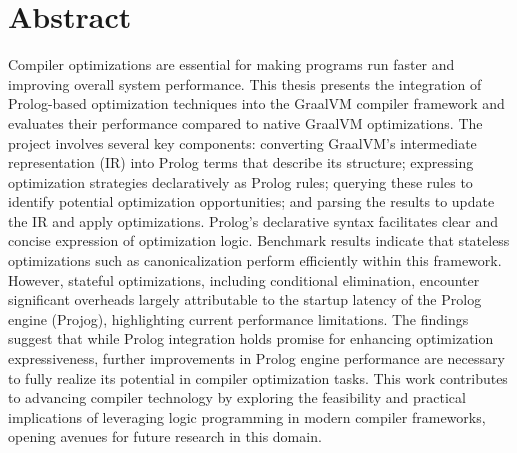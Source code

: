 \chapter[Abstract]{Abstract}

\noindent
Compiler optimizations are essential for making programs run faster and improving overall system performance. This thesis presents the integration of Prolog-based optimization techniques into the GraalVM compiler framework and evaluates their performance compared to native GraalVM optimizations. The project involves several key components: converting GraalVM’s intermediate representation (IR) into Prolog terms that describe its structure; expressing optimization strategies declaratively as Prolog rules; querying these rules to identify potential optimization opportunities; and parsing the results to update the IR and apply optimizations.
Prolog’s declarative syntax facilitates clear and concise expression of optimization logic. Benchmark results indicate that stateless optimizations such as canonicalization perform efficiently within this framework. However, stateful optimizations, including conditional elimination, encounter significant overheads largely attributable to the startup latency of the Prolog engine (Projog), highlighting current performance limitations. The findings suggest that while Prolog integration holds promise for enhancing optimization expressiveness, further improvements in Prolog engine performance are necessary to fully realize its potential in compiler optimization tasks.
This work contributes to advancing compiler technology by exploring the feasibility and practical implications of leveraging logic programming in modern compiler frameworks, opening avenues for future research in this domain.